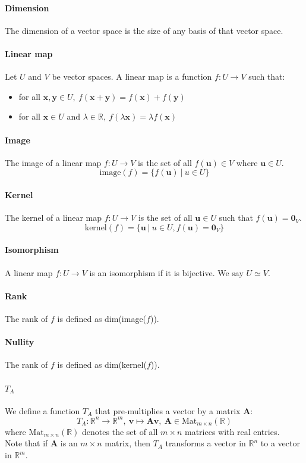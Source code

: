 \documentclass{article}
\newcommand{\R}{\mathbb{R}}
\renewcommand{\vec}[1]{\mathbf{#1}}
\begin{document}
\paragraph{Dimension}
The dimension of a vector space is the size of any basis of that vector space.
\paragraph{Linear map}
Let $ U $ and $ V $ be vector spaces. A linear map is a function $ f : U \to V $ such that:
\begin{itemize}
\item for all $ \vec{x}, \vec{y} \in U, \ f(\vec{x} + \vec{y}) = f(\vec{x}) + f(\vec{y}) $
\item for all $ \vec{x} \in U $ and $ \lambda \in \R, \ f(\lambda \vec{x}) = \lambda f(\vec{x}) $
\end{itemize}
\paragraph{Image}
The image of a linear map $ f : U \to V $ is the set of all $ f(\vec{u}) \in V $ where $ \vec{u} \in U $.
\begin{equation}
\textrm{image}(f) = \{f(\vec{u}) \ | \ u \in U \}
\end{equation}
\paragraph{Kernel}
The kernel of a linear map $ f : U \to V $ is the set of all $ \vec{u} \in U $ such that $ f(\vec{u}) = \vec{0}_{V} $.
\begin{equation}
\textrm{kernel}(f) = \{\vec{u} \ | \ u \in U, f(\vec{u}) = \vec{0}_{V} \}
\end{equation}
\paragraph{Isomorphism}
A linear map $ f : U \to V $ is an isomorphism if it is bijective. We say $ U \simeq V $.
\paragraph{Rank}
The rank of $ f $ is defined as dim(image($ f $)).
\paragraph{Nullity}
The rank of $ f $ is defined as dim(kernel($ f $)).
\paragraph{$ T_{A} $}
We define a function $ T_{A} $ that pre-multiplies a vector by a matrix $ \vec{A} $:
\begin{equation}
T_{A} : \R^{n} \to \R^{m}, \ \vec{v} \mapsto \vec{A}\vec{v}, \ \vec{A} \in \textrm{Mat}_{m \times n}(\R)
\end{equation}
where $  \textrm{Mat}_{m \times n}(\R)  $ denotes the set of all $ m \times n $ matrices with real entries.
\\
Note that if $ \vec{A} $ is an $ m \times n $ matrix, then $ T_{A} $ transforms a vector in $ \R^{n} $ to a vector in $ \R^{m} $.
\end{document}
